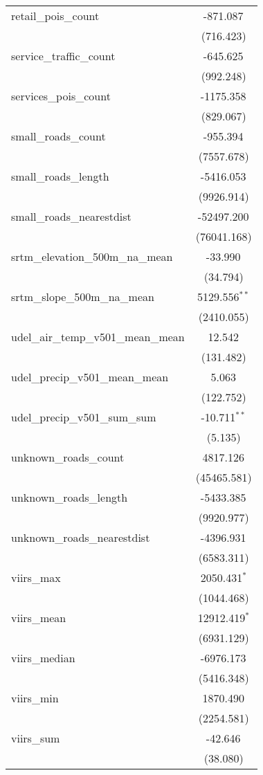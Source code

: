 \begin{table}[!htbp]
\begin{tabular}{@{\extracolsep{5pt}}lc}
 retail_pois_count & -871.087$^{}$ \\
  & (716.423) \\
 service_traffic_count & -645.625$^{}$ \\
  & (992.248) \\
 services_pois_count & -1175.358$^{}$ \\
  & (829.067) \\
 small_roads_count & -955.394$^{}$ \\
  & (7557.678) \\
 small_roads_length & -5416.053$^{}$ \\
  & (9926.914) \\
 small_roads_nearestdist & -52497.200$^{}$ \\
  & (76041.168) \\
 srtm_elevation_500m_na_mean & -33.990$^{}$ \\
  & (34.794) \\
 srtm_slope_500m_na_mean & 5129.556$^{**}$ \\
  & (2410.055) \\
 udel_air_temp_v501_mean_mean & 12.542$^{}$ \\
  & (131.482) \\
 udel_precip_v501_mean_mean & 5.063$^{}$ \\
  & (122.752) \\
 udel_precip_v501_sum_sum & -10.711$^{**}$ \\
  & (5.135) \\
 unknown_roads_count & 4817.126$^{}$ \\
  & (45465.581) \\
 unknown_roads_length & -5433.385$^{}$ \\
  & (9920.977) \\
 unknown_roads_nearestdist & -4396.931$^{}$ \\
  & (6583.311) \\
 viirs_max & 2050.431$^{*}$ \\
  & (1044.468) \\
 viirs_mean & 12912.419$^{*}$ \\
  & (6931.129) \\
 viirs_median & -6976.173$^{}$ \\
  & (5416.348) \\
 viirs_min & 1870.490$^{}$ \\
  & (2254.581) \\
 viirs_sum & -42.646$^{}$ \\
  & (38.080) \\

\end{tabular}
\end{table}
